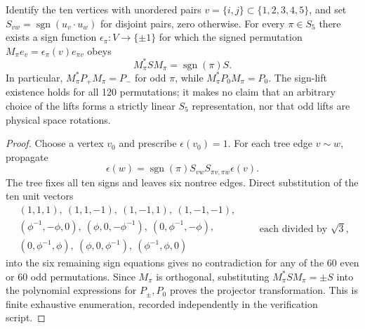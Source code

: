 \documentclass[12pt,a4paper]{article}
\begin{document}
\begin{proposition}
\label{p4c:prop:v320-s5-signed-lift}
Identify the ten vertices with unordered pairs
$v=\{i,j\}\subset\{1,2,3,4,5\}$, and set
$S_{vw}=\operatorname{sgn}(u_v\cdot u_w)$ for disjoint pairs,
zero otherwise. For every $\pi\in S_5$ there exists a sign function
$\epsilon_{\pi}:V\to\{\pm1\}$ for which the signed permutation
$M_\pi e_v=\epsilon_\pi(v)e_{\pi v}$ obeys
\[
 \boxed{M_\pi^*SM_\pi=\operatorname{sgn}(\pi)S.}
\]
In particular, $M_\pi^*P_+M_\pi=P_-$ for odd $\pi$, while
$M_\pi^*P_0M_\pi=P_0$. The sign-lift existence holds for all 120
permutations; it makes no claim that an arbitrary choice of the lifts
forms a strictly linear $S_5$ representation, nor that odd lifts
are physical space rotations.
\end{proposition}
\begin{proof}
Choose a vertex $v_0$ and prescribe $\epsilon(v_0)=1$.
For each tree edge $v\sim w$, propagate
\[
 \epsilon(w)=\operatorname{sgn}(\pi)
 S_{vw}S_{\pi v,\pi w}\epsilon(v).
\]
The tree fixes all ten signs and leaves six nontree edges. Direct
substitution of the ten unit vectors
\[
 \begin{gathered}
 (1,1,1),\ (1,1,-1),\ (1,-1,1),\ (1,-1,-1),\\
 (\phi^{-1},-\phi,0),\ (\phi,0,-\phi^{-1}),\
 (0,\phi^{-1},-\phi),\\
 (0,\phi^{-1},\phi),\ (\phi,0,\phi^{-1}),\
 (\phi^{-1},\phi,0)
 \end{gathered}
 \qquad\text{each divided by }\sqrt3,
\]
into the six remaining sign equations gives no contradiction for
any of the 60 even or 60 odd permutations. Since $M_\pi$ is
orthogonal, substituting $M_\pi^*SM_\pi=\pm S$ into the polynomial
expressions for $P_\pm,P_0$ proves the projector transformation.
This is finite exhaustive enumeration, recorded independently in the
verification script.
\end{proof}
\end{document}
